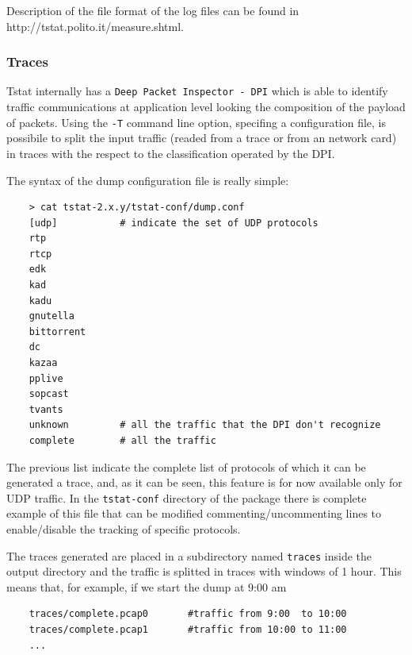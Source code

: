 \documentclass[11pt]{article}
\begin{document}
Description of the file format of the log files can be found in
\textsf{http://tstat.polito.it/measure.shtml}.

\subsubsection{Traces\label{Traces}}


Tstat internally has a \texttt{Deep Packet Inspector - DPI} which is able to identify
traffic communications at application level looking the composition of the payload
of packets. Using the \texttt{-T} command line option, specifing a configuration file,
is possibile to split the input traffic (readed from a trace or from an network card)
in traces with the respect to the classification operated by the DPI.



The syntax of the dump configuration file is really simple:

\begin{small}\begin{verbatim}
    > cat tstat-2.x.y/tstat-conf/dump.conf
    [udp]           # indicate the set of UDP protocols
    rtp
    rtcp
    edk
    kad
    kadu
    gnutella
    bittorrent
    dc
    kazaa
    pplive
    sopcast
    tvants
    unknown         # all the traffic that the DPI don't recognize
    complete        # all the traffic
\end{verbatim}\end{small} \noindent
The previous list indicate the complete list of protocols of which it can be generated
a trace, and, as it can be seen, this feature is for now available only for UDP
traffic. In the \texttt{tstat-conf} directory of the package there is complete example of
this file that can be modified commenting/uncommenting lines to enable/disable
the tracking of specific protocols.



The traces generated are placed in a subdirectory 
named \texttt{traces} inside the output directory and the traffic
is splitted in traces with windows of 1 hour. This means that, for example,
if we start the dump at 9:00 am

\begin{small}\begin{verbatim}
    traces/complete.pcap0       #traffic from 9:00  to 10:00
    traces/complete.pcap1       #traffic from 10:00 to 11:00
    ...
\end{verbatim}\end{small} \noindent
\end{document}
